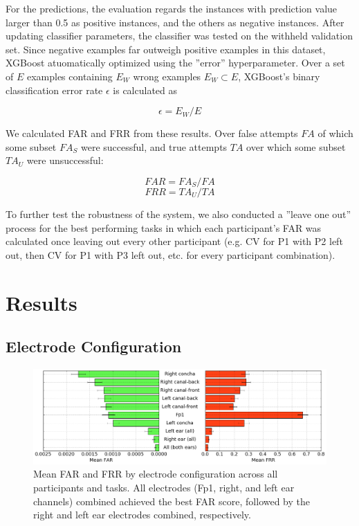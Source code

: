 \documentclass{sigchi}
\begin{document}
For the predictions, the evaluation regards the instances with prediction value larger than 0.5 as positive instances, and the others as negative instances. After updating classifier parameters, the classifier was tested on the withheld validation set. Since negative examples far outweigh positive examples in this dataset, XGBoost atuomatically optimized using the ”error” hyperparameter. Over a set of \(E\) examples containing \(E_W\) wrong examples \(E_W\subset{E}\), XGBoost’s binary classification error rate \(\epsilon\) is calculated as

\[ \epsilon = E_W / E \]

We calculated FAR and FRR from these results. Over false attempts \(FA\) of which some subset \(FA_S\) were successful, and true attempts \(TA\) over which some subset \(TA_U\) were unsuccessful:

\[ FAR = FA_S / FA \]
\[ FRR = TA_U / TA \]

To further test the robustness of the system, we also conducted a ”leave one out” process for the best performing tasks in which each participant’s FAR was calculated once leaving out every other participant (e.g. CV for P1 with P2 left out, then CV for P1 with P3 left out, etc. for every participant combination).

\section{Results}
\subsection{Electrode Configuration}

\begin{figure}[t]
\centering
\includegraphics[width=.9\linewidth]{./figures/mean-far-and-frr-by-electrode-config.png}
\caption{Mean FAR and FRR by electrode configuration across all participants and tasks. All electrodes (Fp1, right, and left ear channels) combined achieved the best FAR score, followed by the right and left ear electrodes combined, respectively.}
\label{fig:meanByElectrode}
\end{figure}
\end{document}
